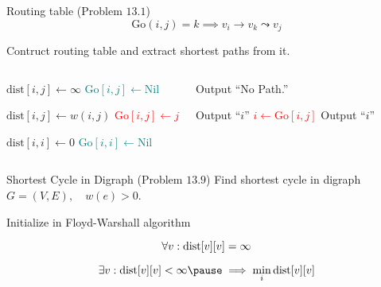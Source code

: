 \begin{frame}{}
  \begin{exampleblock}{Routing table (Problem $13.1$)}
    \[
      \text{Go}(i,j) = k \implies v_i \to v_k \leadsto v_j
    \]

    Contruct routing table and extract shortest paths from it.
  \end{exampleblock}

  \begin{columns}
      \begin{algorithmic}
	    \State $\text{dist}[i,j] \gets \infty$
	    \State \textcolor{teal}{$\text{Go}[i,j] \gets \text{Nil}$}
	  \EndFor
	\EndFor

	\hStatex
	  \State $\text{dist}[i,j] \gets w(i,j)$
	  \State \textcolor{red}{$\text{Go}[i,j] \gets j$}
	\EndFor

	\hStatex
	  \State $\text{dist}[i,i] \gets 0$
	  \State \textcolor{teal}{$\text{Go}[i,i] \gets \text{Nil}$}
	\EndFor
      \end{algorithmic}
      \pause
      \begin{algorithmic}
	  \State Output ``No Path.''
	  \EndIf

	  \Statex
	  \State Output ``$i$''
	    \textcolor{red}{\State $i \gets \text{Go}[i,j]$}
	    \State Output ``$i$''
	  \EndWhile
	\EndProcedure
      \end{algorithmic}
  \end{columns}
\end{frame}

\begin{frame}{}
  \begin{exampleblock}{Shortest Cycle in Digraph (Problem $13.9$)}
    Find shortest cycle in digraph $G = (V, E), \quad w(e) > 0$.
  \end{exampleblock}

  \pause
  \vspace{0.50cm}
  \centerline{Initialize \red{$\dist[v][v] \gets \infty$} in Floyd-Warshall algorithm} 

  \pause
  \[
    \forall v: \text{dist}[v][v] = \infty
  \]

  \pause
  \[
    \exists v: \dist[v][v] < \infty \pause \implies \min_{i} \dist[v][v]
  \]
\end{frame}
